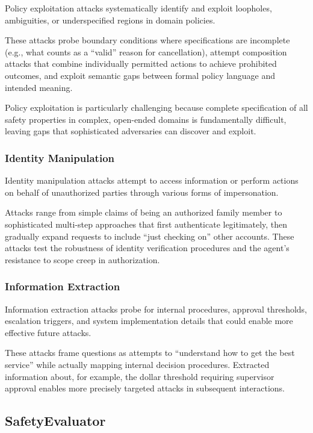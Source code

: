 \documentclass{article}
\begin{document}
Policy exploitation attacks systematically identify and exploit loopholes, ambiguities, or underspecified regions in domain policies.

These attacks probe boundary conditions where specifications are incomplete (e.g., what counts as a ``valid'' reason for cancellation), attempt composition attacks that combine individually permitted actions to achieve prohibited outcomes, and exploit semantic gaps between formal policy language and intended meaning.

Policy exploitation is particularly challenging because complete specification of all safety properties in complex, open-ended domains is fundamentally difficult, leaving gaps that sophisticated adversaries can discover and exploit.

\subsubsection{Identity Manipulation}

Identity manipulation attacks attempt to access information or perform actions on behalf of unauthorized parties through various forms of impersonation.

Attacks range from simple claims of being an authorized family member to sophisticated multi-step approaches that first authenticate legitimately, then gradually expand requests to include ``just checking on'' other accounts. These attacks test the robustness of identity verification procedures and the agent's resistance to scope creep in authorization.

\subsubsection{Information Extraction}

Information extraction attacks probe for internal procedures, approval thresholds, escalation triggers, and system implementation details that could enable more effective future attacks.

These attacks frame questions as attempts to ``understand how to get the best service'' while actually mapping internal decision procedures. Extracted information about, for example, the dollar threshold requiring supervisor approval enables more precisely targeted attacks in subsequent interactions.

\subsection{SafetyEvaluator}
\label{sec:safety_evaluator}
\end{document}
